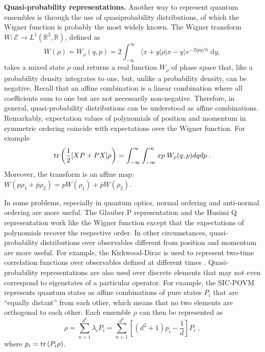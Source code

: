 \documentclass[10pt,twocolumn, nofootinbib]{revtex4-2}
\newcommand{\Ens}[1][E] {\mathcal{#1}} %
\begin{document}

\textbf{Quasi-probability representations.} Another way to represent quantum ensembles is through the use of quasiprobability distributions, of which the Wigner function is probably the most widely known. The Wigner transform $W : \Ens \to L^1(\mathbb{R}^2, \mathbb{R}) $, defined as \cite[eq.~11.8-3a]{mandel1995}
\begin{equation}
	W(\rho) = W_{\rho} (q, p) = 2 \int_{-\infty}^{\infty} \langle x + y | \rho | x - y \rangle e^{-2 i p y / \hbar} \; \mathrm dy,
\end{equation}
takes a mixed state $\rho$ and returns a real function $W_{\rho}$ of phase space that, like a probability density integrates to one, but, unlike a probability density, can be negative. Recall that an affine combination is a linear combination where all coefficients sum to one but are not necessarily non-negative. Therefore, in general, quasi-probability distributions can be understood as affine combinations. Remarkably, expectation values of polynomials of position and momentum in symmetric ordering coincide with expectations over the Wigner function. For example
\begin{equation}
	\operatorname{tr} \left( \frac{1}{2}[XP+PX] \rho \right) = \int_{-\infty}^{\infty} \int_{-\infty}^{\infty} xp \; W_{\rho} (q, p) dq dp \; .
\end{equation}
Moreover, the transform is an affine map: $W(p \rho_1 + \bar{p} \rho_2 ) = p W(\rho_1) + \bar{p} W(\rho_2)$.

In some problems, especially in quantum optics, normal ordering and anti-normal ordering are more useful. The Glauber P representation and the Husimi Q representation work like the Wigner function except that the expectations of polynomials recover the respective order. In other circumstances, quasi-probability distributions over observables different from position and momentum are more useful. For example, the Kirkwood-Dirac is used to represent two-time correlation functions over observables defined at different times \cite{lostaglio2023}. Quasi-probability representations are also used over discrete elements that may not even correspond to eigenstates of a particular operator. For example, the SIC-POVM represents quantum states as affine combinations of pure states $P_i$ that are ``equally distant'' from each other, which means that no two elements are orthogonal to each other. Each ensemble $\rho$ can then be represented as \cite[eqs. 28-29]{fuchs2004}
\begin{equation}
	\rho = \sum_{n=1}^{d^2} \lambda_i P_i = \sum_{n=1}^{d^2} \left[ (d^2 + 1) p_i - \frac{1}{d} \right] P_i \; ,
\end{equation}
where $p_i = \operatorname{tr} \left(P_i \rho\right)$.
\end{document}
